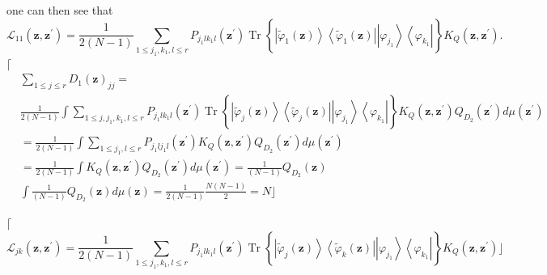 \documentclass[aps,preprint]{revtex4}%
\begin{document}
one can then see that
\[
\mathcal{L}_{11}\left(  \mathbf{z,z}^{\prime}\right)  =\frac{1}{2\left(
N-1\right)  }\sum_{1\leq j_{1},k_{1},l\leq r}P_{j_{1}lk_{1}l}\left(
\mathbf{z}^{\prime}\right)  \operatorname*{Tr}\left\{  \left\vert
\tilde{\varphi}_{1}\left(  \mathbf{z}\right)  \right\rangle \left\langle
\tilde{\varphi}_{1}\left(  \mathbf{z}\right)  \right\vert
\overset{}{\left\vert \varphi_{j_{1}}\right\rangle \left\langle \varphi
_{k_{1}}\right\vert }\right\}  K_{Q}\left(  \mathbf{z,z}^{\prime}\right)  .
\]
$\lceil$%
\begin{align}
&  \sum_{1\leq j\leq r}D_{1}\left(  \mathbf{z}\right)  _{jj}=\nonumber\\
&  \frac{1}{2\left(  N-1\right)  }\int\sum_{1\leq j,j_{1},k_{1},l\leq
r}P_{j_{1}lk_{1}l}\left(  \mathbf{z}^{\prime}\right)  \operatorname*{Tr}%
\left\{  \left\vert \tilde{\varphi}_{j}\left(  \mathbf{z}\right)
\right\rangle \left\langle \tilde{\varphi}_{j}\left(  \mathbf{z}\right)
\right\vert \overset{}{\left\vert \varphi_{j_{1}}\right\rangle \left\langle
\varphi_{k_{1}}\right\vert }\right\}  K_{Q}\left(  \mathbf{z,z}^{\prime
}\right)  Q_{D_{2}}\left(  \mathbf{z}^{\prime}\right)  d\mu\left(
\mathbf{z}^{\prime}\right)  \nonumber\\
&  =\frac{1}{2\left(  N-1\right)  }\int\sum_{1\leq j_{1},l\leq r}%
P_{j_{1}lj_{1}l}\left(  \mathbf{z}^{\prime}\right)  K_{Q}\left(
\mathbf{z,z}^{\prime}\right)  Q_{D_{2}}\left(  \mathbf{z}^{\prime}\right)
d\mu\left(  \mathbf{z}^{\prime}\right)  \nonumber\\
&  =\frac{1}{2\left(  N-1\right)  }\int K_{Q}\left(  \mathbf{z,z}^{\prime
}\right)  Q_{D_{2}}\left(  \mathbf{z}^{\prime}\right)  d\mu\left(
\mathbf{z}^{\prime}\right)  =\frac{1}{\left(  N-1\right)  }Q_{D_{2}}\left(
\mathbf{z}\right)  \nonumber\\
&  \int\frac{1}{\left(  N-1\right)  }Q_{D_{2}}\left(  \mathbf{z}\right)
d\mu\left(  \mathbf{z}\right)  =\frac{1}{2\left(  N-1\right)  }\frac{N\left(
N-1\right)  }{2}=N\rfloor
\end{align}


$\lceil$%
\begin{equation}
\mathcal{L}_{jk}\left(  \mathbf{z,z}^{\prime}\right)  =\frac{1}{2\left(
N-1\right)  }\sum_{1\leq j_{1},k_{1},l\leq r}P_{j_{1}lk_{1}l}\left(
\mathbf{z}^{\prime}\right)  \operatorname*{Tr}\left\{  \left\vert
\tilde{\varphi}_{j}\left(  \mathbf{z}\right)  \right\rangle \left\langle
\tilde{\varphi}_{k}\left(  \mathbf{z}\right)  \right\vert
\overset{}{\left\vert \varphi_{j_{1}}\right\rangle \left\langle \varphi
_{k_{1}}\right\vert }\right\}  K_{Q}\left(  \mathbf{z,z}^{\prime}\right)
\rfloor
\end{equation}
\end{document}
